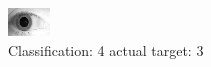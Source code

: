 \begin{figure}[h!]
\begin{center}
\includegraphics[width=0.60\columnwidth]{figures/ID1959_class_4_target_3.png}
\end{center}
\caption{ Classification: 4 actual target: 3}
\label{fig:ID1959_class_4_target_3}
\end{figure}
